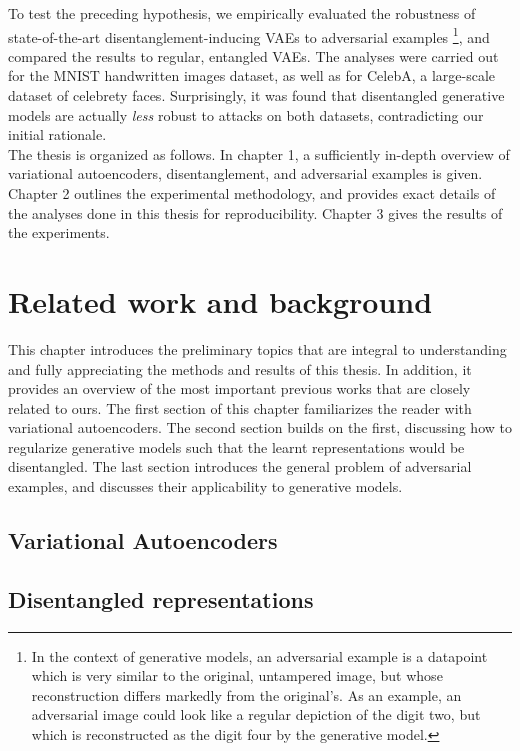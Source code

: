 \documentclass{report}
\begin{document}
\noindent To test the preceding hypothesis, we empirically evaluated the robustness of state-of-the-art disentanglement-inducing VAEs to adversarial examples \footnote{In the context of generative models, an adversarial example is a datapoint which is very similar to the original, untampered image, but whose reconstruction differs markedly from the original's. As an example, an adversarial image could look like a regular depiction of the digit two, but which is reconstructed as the digit four by the generative model.}, and compared the results to regular, entangled VAEs. The analyses were carried out for the MNIST handwritten images dataset, as well as for CelebA, a large-scale dataset of celebrety faces. Surprisingly, it was found that disentangled generative models are actually \textit{less} robust to attacks on both datasets, contradicting our initial rationale. \\

\noindent The thesis is organized as follows. In chapter 1, a sufficiently in-depth overview of variational autoencoders, disentanglement, and adversarial examples is given. Chapter 2 outlines the experimental methodology, and provides exact details of the analyses done in this thesis for reproducibility. Chapter 3 gives the results of the experiments. 

\chapter{Related work and background}

This chapter introduces the preliminary topics that are integral to understanding and fully appreciating the methods and results of this thesis. In addition, it provides an overview of the most important previous works that are closely related to ours. The first section of this chapter familiarizes the reader with variational autoencoders. The second section builds on the first, discussing how to regularize generative models such that the learnt representations would be disentangled. The last section introduces the general problem of adversarial examples, and discusses their applicability to generative models.

\section{Variational Autoencoders}
\section{Disentangled representations}
\end{document}
